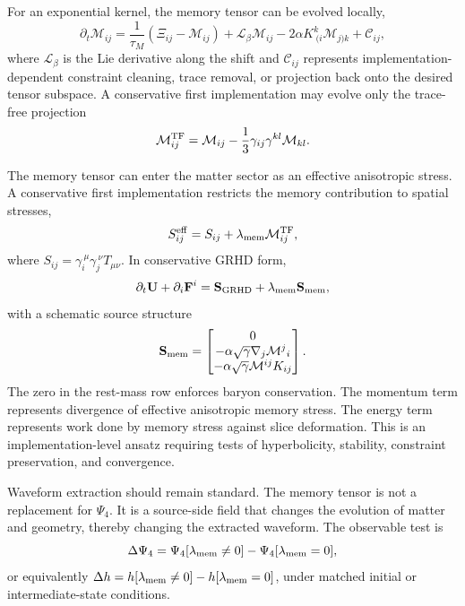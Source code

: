 \documentclass[11pt]{article}
\begin{document}
For an exponential kernel, the memory tensor can be evolved locally,
\begin{equation}
\partial_t\mathcal{M}_{ij}=\frac{1}{\tau_M}\left(\Xi_{ij}-\mathcal{M}_{ij}\right)+\mathcal{L}_{\beta}\mathcal{M}_{ij}-2\alpha K^k_{\ (i}\mathcal{M}_{j)k}+\mathcal{C}_{ij},
\end{equation}
where \(\mathcal{L}_{\beta}\) is the Lie derivative along the shift and \(\mathcal{C}_{ij}\) represents implementation-dependent constraint cleaning, trace removal, or projection back onto the desired tensor subspace. A conservative first implementation may evolve only the trace-free projection
\begin{equation}
\mathcal{M}^{\rm TF}_{ij}=\mathcal{M}_{ij}-\frac{1}{3}\gamma_{ij}\gamma^{kl}\mathcal{M}_{kl}.
\end{equation}

The memory tensor can enter the matter sector as an effective anisotropic stress. A conservative first implementation restricts the memory contribution to spatial stresses,
\begin{equation}
S_{ij}^{\rm eff}=S_{ij}+\lambda_{\rm mem}\mathcal{M}^{\rm TF}_{ij},
\end{equation}
where \(S_{ij}=\gamma_i^{\ \mu}\gamma_j^{\ \nu}T_{\mu\nu}\). In conservative GRHD form,
\begin{equation}
\partial_t\mathbf{U}+\partial_i\mathbf{F}^i=\mathbf{S}_{\rm GRHD}+\lambda_{\rm mem}\mathbf{S}_{\rm mem},
\end{equation}
with a schematic source structure
\begin{equation}
\mathbf{S}_{\rm mem}=\begin{bmatrix}
0 \\
-\alpha\sqrt{\gamma}\nabla_j\mathcal{M}^{j}{}_{i} \\
-\alpha\sqrt{\gamma}\mathcal{M}^{ij}K_{ij}
\end{bmatrix}.
\end{equation}
The zero in the rest-mass row enforces baryon conservation. The momentum term represents divergence of effective anisotropic memory stress. The energy term represents work done by memory stress against slice deformation. This is an implementation-level ansatz requiring tests of hyperbolicity, stability, constraint preservation, and convergence.

Waveform extraction should remain standard. The memory tensor is not a replacement for \(\Psi_4\). It is a source-side field that changes the evolution of matter and geometry, thereby changing the extracted waveform. The observable test is
\begin{equation}
\Delta\Psi_4=\Psi_4[\lambda_{\rm mem}\neq0]-\Psi_4[\lambda_{\rm mem}=0],
\end{equation}
or equivalently \(\Delta h=h[\lambda_{\rm mem}\neq0]-h[\lambda_{\rm mem}=0]\), under matched initial or intermediate-state conditions.
\end{document}

